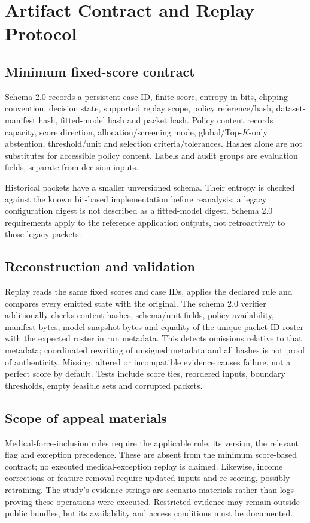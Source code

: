 \section{Artifact Contract and Replay Protocol}
\label{app:artifact-schema}
\subsection{Minimum fixed-score contract}
Schema 2.0 records a persistent case ID, finite score, entropy in bits, clipping convention, decision state, supported replay scope, policy reference/hash, dataset-manifest hash, fitted-model hash and packet hash. Policy content records capacity, score direction, allocation/screening mode, global/Top-$K$-only abstention, threshold/unit and selection criteria/tolerances. Hashes alone are not substitutes for accessible policy content. Labels and audit groups are evaluation fields, separate from decision inputs.

Historical packets have a smaller unversioned schema. Their entropy is checked against the known bit-based implementation before reanalysis; a legacy configuration digest is not described as a fitted-model digest. Schema 2.0 requirements apply to the reference application outputs, not retroactively to those legacy packets.

\subsection{Reconstruction and validation}
Replay reads the same fixed scores and case IDs, applies the declared rule and compares every emitted state with the original. The schema 2.0 verifier additionally checks content hashes, schema/unit fields, policy availability, manifest bytes, model-snapshot bytes and equality of the unique packet-ID roster with the expected roster in run metadata. This detects omissions relative to that metadata; coordinated rewriting of unsigned metadata and all hashes is not proof of authenticity. Missing, altered or incompatible evidence causes failure, not a perfect score by default. Tests include score ties, reordered inputs, boundary thresholds, empty feasible sets and corrupted packets.

\subsection{Scope of appeal materials}
Medical-force-inclusion rules require the applicable rule, its version, the relevant flag and exception precedence. These are absent from the minimum score-based contract; no executed medical-exception replay is claimed. Likewise, income corrections or feature removal require updated inputs and re-scoring, possibly retraining. The study's evidence strings are scenario materials rather than logs proving these operations were executed. Restricted evidence may remain outside public bundles, but its availability and access conditions must be documented.

